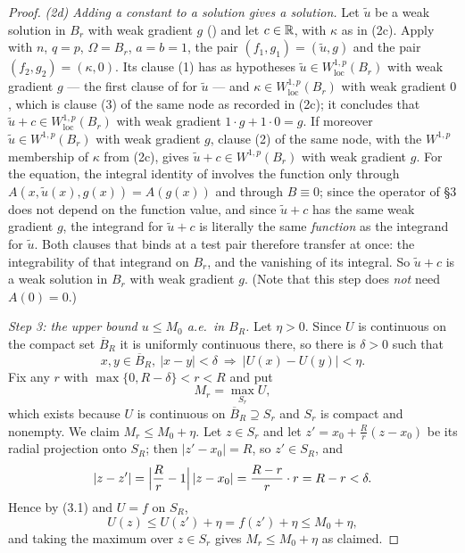 \begin{proof}
\emph{(2d) Adding a constant to a solution gives a solution.}  Let $\tilde u$ be
a weak solution in $B_r$ with weak gradient $g$ () and
let $c\in\mathbb{R}$, with $\kappa$ as in (2c).  Apply  with
$n$, $q=p$, $\Omega=B_r$, $a=b=1$, the pair $(f_1,g_1)=(\tilde u,g)$ and the
pair $(f_2,g_2)=(\kappa,0)$.  Its clause (1) has as hypotheses
$\tilde u\in W^{1,p}_{\mathrm{loc}}(B_r)$ with weak gradient $g$ --- the first
clause of  for $\tilde u$ --- and
$\kappa\in W^{1,p}_{\mathrm{loc}}(B_r)$ with weak gradient $0$, which is clause
(3) of the same node as recorded in (2c); it concludes that
$\tilde u+c\in W^{1,p}_{\mathrm{loc}}(B_r)$ with weak gradient
$1\cdot g+1\cdot0=g$.  If moreover $\tilde u\in W^{1,p}(B_r)$ with weak gradient
$g$, clause (2) of the same node, with the $W^{1,p}$ membership of $\kappa$ from
(2c), gives $\tilde u+c\in W^{1,p}(B_r)$ with weak gradient $g$.  For the
equation, the integral identity of  involves the
function only through $A(x,\tilde u(x),g(x))=A(g(x))$ and through $B\equiv0$;
since the operator of \S3 does not depend on the function value, and since
$\tilde u+c$ has the same weak gradient $g$, the integrand for $\tilde u+c$ is
literally the same \emph{function} as the integrand for $\tilde u$.  Both
clauses that  binds at a test pair therefore transfer
at once: the integrability of that integrand on $B_r$, and the vanishing of its
integral.  So $\tilde u+c$ is a weak solution in
$B_r$ with weak gradient $g$.  (Note that this step does \emph{not} need
$A(0)=0$.)

\emph{Step 3: the upper bound $u\le M_0$ a.e.\ in $B_R$.}  Let $\eta>0$.  Since
$U$ is continuous on the compact set $\overline B_R$ it is uniformly continuous
there, so there is $\delta>0$ such that
\[
x,y\in\overline B_R,\ |x-y|<\delta\ \Longrightarrow\ |U(x)-U(y)|<\eta .
\tag{3.1}
\]
Fix any $r$ with $\max\{0,R-\delta\}<r<R$ and put
\[
M_r=\max_{S_r}U ,
\]
which exists because $U$ is continuous on $\overline B_R\supseteq S_r$ and $S_r$
is compact and nonempty.  We claim $M_r\le M_0+\eta$.  Let $z\in S_r$ and let
$z'=x_0+\frac Rr(z-x_0)$ be its radial projection onto $S_R$; then
$|z'-x_0|=R$, so $z'\in S_R$, and
\[
|z-z'|=\Bigl|\frac Rr-1\Bigr|\,|z-x_0|=\frac{R-r}{r}\cdot r=R-r<\delta .
\]
Hence by (3.1) and $U=f$ on $S_R$,
\[
U(z)\le U(z')+\eta=f(z')+\eta\le M_0+\eta ,
\]
and taking the maximum over $z\in S_r$ gives $M_r\le M_0+\eta$ as claimed.


\end{proof}
